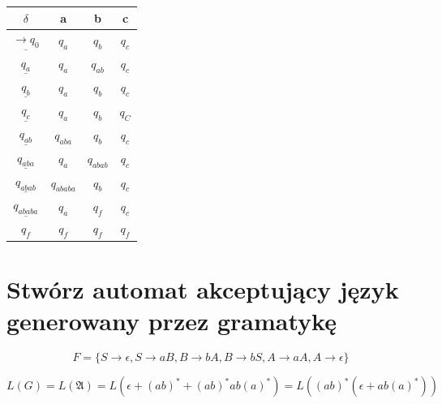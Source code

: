 \documentclass{../notatki}
\begin{document}
\begin{table}[h!]
  \centering
  \begin{tabular}{c|c|c|c}
    $\delta$                       & a           & b            & c \\ \hline
    $\underline{\rightarrow q_0}$  & $q_a$       & $q_b$        &
    $q_c$ \\ \hline
    $\underline{q_a}$              & $q_a$       & $q_{ab}$     &
    $q_c$ \\ \hline
    $\underline{q_b}$              & $q_a$       & $q_b$        &
    $q_c$ \\ \hline
    $\underline{q_c}$              & $q_a$       & $q_b$        &
    $q_C$ \\ \hline
    $\underline{q_{ab}}$           & $q_{aba}$   & $q_b$        &
    $q_c$ \\ \hline
    $\underline{q_{aba}}$          & $q_a$       & $q_{abab}$   &
    $q_c$ \\ \hline
    $\underline{q_{abab}}$         & $q_{ababa}$ & $q_b$        &
    $q_c$ \\ \hline
    $\underline{q_{ababa}}$        & $q_a$       & $q_f$        &
    $q_c$ \\ \hline
    $q_f$                          & $q_f$       & $q_f$        &
    $q_f$ \\ \hline
  \end{tabular}
\end{table}

\section{Stwórz automat akceptujący język generowany przez gramatykę}

$$
F = \{S \rightarrow \epsilon, S \rightarrow aB, B \rightarrow bA, B
\rightarrow bS, A \rightarrow aA, A \rightarrow \epsilon\}
$$

\divider

\begin{figure}[h]
  \centering
\end{figure}

$$
L(G) = L(\mathfrak{A}) = L(\epsilon + (ab)^* + (ab)^*ab(a)^*) =
L((ab)^*(\epsilon + ab(a)^*))
$$
\end{document}
